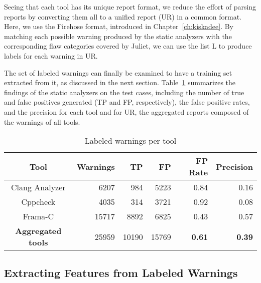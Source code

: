 Seeing that each tool has its unique report format, we reduce the effort of
parsing reports by converting them all to a unified report (UR) in a common
format. Here, we use the Firehose format, introduced in
Chapter~\ref{ch:kiskadee}.  By matching each possible warning produced by the
static analyzers with the corresponding flaw categories covered by Juliet, we
can use the list L to produce labels for each warning in UR.

The set of labeled warnings can finally be examined to have a training set
extracted from it, as discussed in the next section.
Table~\ref{tab:labeled_warnings} summarizes the findings of the static
analyzers on the test cases, including the number of true and false positives
generated (TP and FP, respectively), the false positive rates, and the precision
for each tool and for UR, the aggregated reports composed of the warnings of
all tools.

  \begin{table}
    \begin{center}
        \begin{tabular}{crrrrr}\hline
          Tool & Warnings & TP & FP & FP Rate & Precision \\
        \hline
          Clang Analyzer & 6207 & 984 & 5223 & 0.84 & 0.16 \\
          Cppcheck & 4035 & 314 & 3721 & 0.92 & 0.08 \\
          Frama-C & 15717 & 8892 & 6825 & 0.43 & 0.57 \\
          \textbf{Aggregated tools} & 25959 & 10190 & 15769 & \textbf{0.61}  & \textbf{0.39} \\ \hline
        \end{tabular}
        \caption{Labeled warnings per tool}\label{tab:labeled_warnings}
    \end{center}
\end{table}


\subsection{Extracting Features from Labeled Warnings}\label{sec:data:features}


